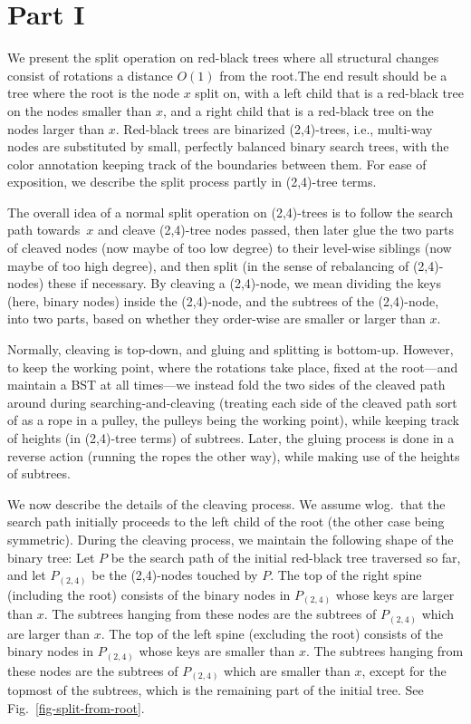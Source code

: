 \documentclass[letterpaper,11pt]{article}
\begin{document}
\section*{Part I}

We present the split operation on red-black trees where all structural 
changes consist of rotations a distance $O(1)$ from the root.The end 
result should be a tree where the root is the node $x$ split on, 
with a left child that is a red-black tree on the nodes smaller than $x$,
and a right child that is a red-black tree on the nodes larger than
$x$. Red-black trees are binarized (2,4)-trees, i.e., multi-way nodes are
substituted by small, perfectly balanced binary search trees, with the
color annotation keeping track of the boundaries between them. For ease of
exposition, we describe the split process partly in (2,4)-tree terms.

The overall idea of a normal split operation on (2,4)-trees is to follow
the search path towards~$x$ and cleave (2,4)-tree nodes passed, then later
glue the two parts of cleaved nodes (now maybe of too low degree) to their
level-wise siblings (now maybe of too high degree), and then split (in the
sense of rebalancing of (2,4)-nodes) these if necessary. By cleaving a
(2,4)-node, we mean dividing the keys (here, binary nodes) inside the
(2,4)-node, and the subtrees of the (2,4)-node, into two parts, based on
whether they order-wise are smaller or larger than $x$.

Normally, cleaving is top-down, and gluing and splitting is bottom-up.
However, to keep the working point, where the rotations take place, fixed
at the root---and maintain a BST at all times---we instead fold the two
sides of the cleaved path around during searching-and-cleaving (treating
each side of the cleaved path sort of as a rope in a pulley, the pulleys
being the working point), while keeping track of heights (in (2,4)-tree
terms) of subtrees. Later, the gluing process is done in a reverse action
(running the ropes the other way), while making use of the heights of
subtrees.

We now describe the details of the cleaving process. We assume wlog.\ that
the search path initially proceeds to the left child of the root (the other
case being symmetric). During the cleaving process, we maintain the
following shape of the binary tree: Let $P$ be the search path of the
initial red-black tree traversed so far, and let $P_{(2,4)}$ be the
(2,4)-nodes touched by $P$. The top of the right spine (including the root)
consists of the binary nodes in $P_{(2,4)}$ whose keys are larger than
$x$. The subtrees hanging from these nodes are the subtrees of $P_{(2,4)}$
which are larger than $x$.  The top of the left spine (excluding the root)
consists of the binary nodes in $P_{(2,4)}$ whose keys are smaller than
$x$. The subtrees hanging from these nodes are the subtrees of $P_{(2,4)}$
which are smaller than $x$, except for the topmost of the subtrees, which
is the remaining part of the initial tree. See
Fig.~\ref{fig-split-from-root}.
\end{document}
